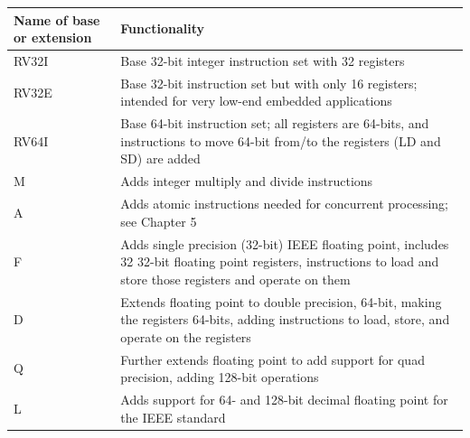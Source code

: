 \documentclass[a4paper,11pt]{article}
\begin{document}
\begin{table}[H]
	\centering
	\begin{tabular}{ p{4cm} p{10cm}}
		\hline
		\textbf{Name of base or extension} & \textbf{Functionality}                                                                                                                                              \\
		\hline
		RV32I                              & Base 32-bit integer instruction set with 32 registers                                                                                                               \\
		\hline
		RV32E                              & Base 32-bit instruction set but with only 16 registers; intended for very low-end embedded applications                                                             \\
		\hline
		RV64I                              & Base 64-bit instruction set; all registers are 64-bits, and instructions to move 64-bit from/to the registers (LD and SD) are added                                 \\
		\hline
		M                                  & Adds integer multiply and divide instructions                                                                                                                       \\
		\hline
		A                                  & Adds atomic instructions needed for concurrent processing; see Chapter 5                                                                                            \\
		\hline
		F                                  & Adds single precision (32-bit) IEEE floating point, includes 32 32-bit floating point registers, instructions to load and store those registers and operate on them \\
		\hline
		D                                  & Extends floating point to double precision, 64-bit, making the registers 64-bits, adding instructions to load, store, and operate on the registers                  \\
		\hline
		Q                                  & Further extends floating point to add support for quad precision, adding 128-bit operations                                                                         \\
		\hline
		L                                  & Adds support for 64- and 128-bit decimal floating point for the IEEE standard                                                                                       \\

\end{tabular}
\end{table}
\end{document}
